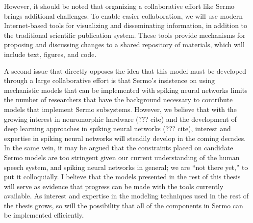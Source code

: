 However, it should be noted that
organizing a collaborative effort
like Sermo brings additional challenges.
To enable easier collaboration,
we will use modern Internet-based tools
for visualizing
and disseminating information,
in addition to the traditional
scientific publication system.
These tools provide mechanisms
for proposing and discussing changes
to a shared repository of materials,
which will include text, figures, and code.

A second issue that directly opposes
the idea that this model must be
developed through a large collaborative effort
is that Sermo's insistence on
using mechanistic models that
can be implemented with spiking neural networks
limits the number of researchers
that have the background necessary
to contribute models that implement
Sermo subsystems.
However, we believe that with the growing
interest in neuromorphic hardware (??? cite)
and the development of deep learning approaches
in spiking neural networks (??? cite),
interest and expertise in spiking neural networks
will steadily develop in the coming decades.
In the same vein, it may be argued that
the constraints placed on candidate Sermo models
are too stringent given our current understanding
of the human speech system,
and spiking neural networks in general;
we are ``not there yet,'' to put it colloquially.
I believe that the models presented
in the rest of this thesis
will serve as evidence that
progress can be made with
the tools currently available.
As interest and expertise in
the modeling techniques used
in the rest of the thesis grows,
so will the possibility
that all of the components in Sermo
can be implemented efficiently.
